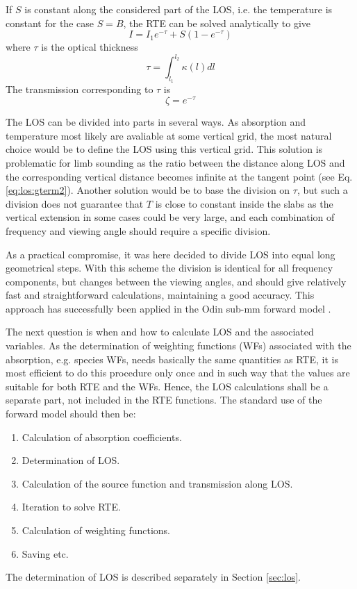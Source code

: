  If $S$ is constant along the considered part of the LOS, i.e. the
 temperature is constant for the case $S=B$, the RTE can be solved
 analytically to give
 \begin{equation}
   I = I_1e^{-\tau} + S\left(1-e^{-\tau}\right)
  \label{eq:rte:step}
 \end{equation}
 where $\tau$ is the optical thickness
 \begin{equation}
   \tau = \int_{l_1}^{l_2}{\kappa(l)dl}
 \end{equation}
 The transmission corresponding to $\tau$ is
 \begin{equation}
   \zeta = e^{-\tau}
 \end{equation}  



 \label{sec:rte:practical}
 
 The LOS can be divided into parts in several ways. As absorption and
 temperature most likely are avaliable at some vertical grid, the most
 natural choice would be to define the LOS using this vertical grid.
 This solution is problematic for limb sounding as the ratio between
 the distance along LOS and the corresponding vertical distance
 becomes infinite at the tangent point (see Eq. \ref{eq:los:gterm2}).
 Another solution would be to base the division on $\tau$, but such a
 division does not guarantee that $T$ is close to constant inside the
 slabs as the vertical extension in some cases could be very large,
 and each combination of frequency and viewing angle should require a
 specific division.
  
 As a practical compromise, it was here decided to divide LOS into
 equal long geometrical steps. With this scheme the division is
 identical for all frequency components, but changes between the
 viewing angles, and should give relatively fast and straightforward
 calculations, maintaining a good accuracy. This approach has
 successfully been applied in the Odin sub-mm forward model 
 \citep{eriksson:97a,eriksson:00a}.
  
 The next question is when and how to calculate LOS and the associated
 variables. As the determination of weighting functions (WFs)
 associated with the absorption, e.g. species WFs, needs basically the
 same quantities as RTE, it is most efficient to do this procedure
 only once and in such way that the values are suitable for both RTE
 and the WFs. Hence, the LOS calculations shall be a separate part,
 not included in the RTE functions. The standard use of the forward
 model should then be:
  \begin{enumerate}
    \item Calculation of absorption coefficients.
    \item Determination of LOS.
    \item Calculation of the source function and transmission along LOS.
    \item Iteration to solve RTE.
    \item Calculation of weighting functions.
    \item Saving etc.
  \end{enumerate}
 The determination of LOS is described separately in Section \ref {sec:los}. 
  

